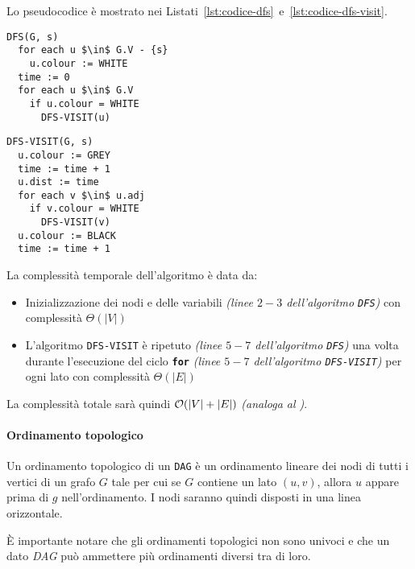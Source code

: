 \documentclass[italian, 10pt]{article}
\begin{document}
\bigskip
Lo pseudocodice è mostrato nei Listati~\ref{lst:codice-dfs}~e~\ref{lst:codice-dfs-visit}.

\begin{minipage}[t]{.495\textwidth}
  \begin{lstlisting}[style=pseudocode, caption={Algoritmo \texttt{DFS}}, label={lst:codice-dfs}]
DFS(G, s)
  for each u $\in$ G.V - {s}
    u.colour := WHITE
  time := 0
  for each u $\in$ G.V
    if u.colour = WHITE
      DFS-VISIT(u)
\end{lstlisting}
\end{minipage}
\begin{minipage}[t]{.495\textwidth}
  \begin{lstlisting}[style=pseudocode, caption={Funzione di supporto a \texttt{DFS}}, label={lst:codice-dfs-visit}]
DFS-VISIT(G, s)
  u.colour := GREY
  time := time + 1
  u.dist := time
  for each v $\in$ u.adj
    if v.colour = WHITE
      DFS-VISIT(v)
  u.colour := BLACK
  time := time + 1
\end{lstlisting}
\end{minipage}

La complessità temporale dell'algoritmo è data da:

\begin{itemize}
  \item Inizializzazione dei nodi e delle variabili \textit{(linee \(2-3\) dell'algoritmo \texttt{DFS})} con complessità \(\Theta(|V|)\)
  \item L'algoritmo \texttt{DFS-VISIT} è ripetuto \textit{(linee \(5-7\) dell'algoritmo \texttt{DFS})} una volta durante l'esecuzione del ciclo \textbf{\texttt{for}} \textit{(linee \(5-7\) dell'algoritmo \texttt{DFS-VISIT})} per ogni lato con complessità \(\Theta(|E|)\)
\end{itemize}

La complessità totale sarà quindi \(\mathcal{O}(|V|+|E|)\) \textit{(analoga al \BFS)}.

\paragraph{Ordinamento topologico}

Un ordinamento topologico di un \texttt{DAG} è un ordinamento lineare dei nodi di tutti i vertici di un grafo \(G\) tale per cui se \(G\) contiene un lato \((u, v)\), allora \(u\) appare prima di \(g\) nell'ordinamento.
I nodi saranno quindi disposti in una linea orizzontale.

È importante notare che gli ordinamenti topologici non sono univoci e che un dato \textit{DAG} può ammettere più ordinamenti diversi tra di loro.
\end{document}
